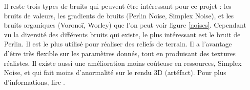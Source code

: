 \documentclass[a4paper]{article}
\begin{document}
        
    Il reste trois types de bruits qui peuvent être intéressant pour ce projet : les bruits de valeurs, les gradients de bruits (Perlin Noise, Simplex Noise), et les bruits organiques (Voronoï, Worley) que l'on peut voir figure  \ref{noises}. Cependant vu la diversité des différents bruits qui existe, le plus intéressant est le bruit de Perlin. Il est le plus utilisé pour réaliser des reliefs de terrain. Il a l'avantage d'être très flexible sur les paramètres donnés, tout en produisant des textures réalistes. Il existe aussi une amélioration moins coûteuse en ressources, Simplex Noise, et qui fait moins d'anormalité sur le rendu 3D (artéfact). Pour plus d'informations, lire \cite{BookShader}.\\
\end{document}

